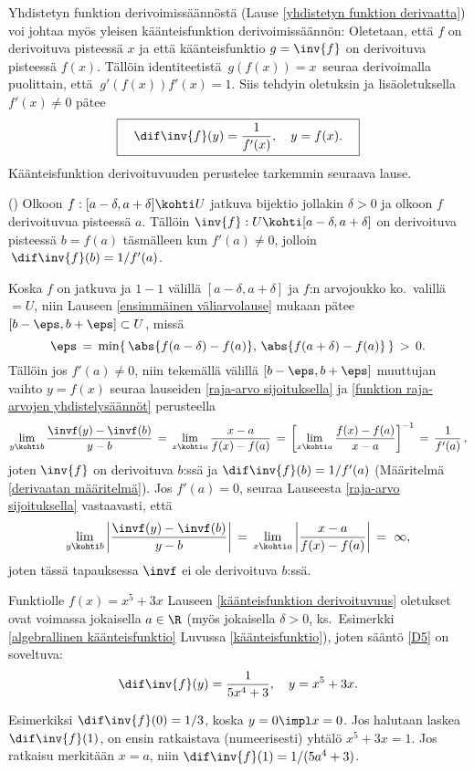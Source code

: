 Yhdistetyn funktion derivoimissäännöstä (Lause \ref{yhdistetyn funktion derivaatta}) voi
johtaa myös yleisen käänteisfunktion derivoimissäännön: Oletetaan, että $f$ on derivoituva
pisteessä $x$ ja että käänteisfunktio $g=\inv{f}$ on derivoituva pisteessä $f(x)$. Tällöin
identiteetistä $\,g(f(x))=x\,$ seuraa derivoimalla puolittain, että $\ g'(f(x))f'(x)=1$.
Siis tehdyin oletuksin ja lisäoletuksella $f'(x) \neq 0$ pätee
\begin{equation} \label{D5}
\boxed{\quad \dif\inv{f}(y)=\frac{1}{f'(x)},\quad y=f(x). \quad}
\end{equation}
Käänteisfunktion derivoituvuuden perustelee tarkemmin seuraava lause.
\begin{Lause} () \label{käänteisfunktion derivoituvuus}
%
Olkoon $f: [a-\delta,a+\delta] \kohti U$ jatkuva bijektio jollakin $\delta>0$ ja olkoon
$f$ derivoituvua pisteessä $a$. Tällöin $\inv{f}: U \kohti [a-\delta,a+\delta]$ on
derivoituva pisteessä $b=f(a)$ täsmälleen kun $f'(a) \neq 0$, jolloin 
$\,\dif \inv{f}(b)=1/f'(a)$.
\end{Lause}
\tod Koska $f$ on jatkuva ja $1-1$ välillä $[a-\delta,a+\delta]$ ja $f$:n arvojoukko
ko.\ valillä $=U$, niin Lauseen \ref{ensimmäinen väliarvolause} mukaan pätee
$[b-\eps,b+\eps] \subset U$, missä
\[
\eps \,=\, \min\{\,\abs{f(a-\delta)-f(a)},\,\abs{f(a+\delta)-f(a)}\,\} \,>\, 0.
\]
Tällöin jos $f'(a) \neq 0$, niin tekemällä välillä $[b-\eps,b+\eps]$ muuttujan
vaihto $y=f(x)$ seuraa lauseiden \ref{raja-arvo sijoituksella} ja
\ref{funktion raja-arvojen yhdistelysäännöt} perusteella
\[
\lim_{y \kohti b} \frac{\invf(y)-\invf(b)}{y-b} 
           \,=\,\lim_{x \kohti a} \frac{x-a}{f(x)-f(a)}
           \,=\,\left[\lim_{x \kohti a} \frac{f(x)-f(a)}{x-a}\right]^{-1} 
           \,=\, \frac{1}{f'(a)}\,,
\]
joten $\inv{f}$ on derivoituva $b$:ssä ja $\dif\inv{f}(b)=1/f'(a)$ (Määritelmä
\ref{derivaatan määritelmä}). Jos $f'(a)=0$, seuraa Lauseesta \ref{raja-arvo sijoituksella}
vastaavasti, että
\[
\lim_{y \kohti b} \left|\frac{\invf(y)-\invf(b)}{y-b}\right|
            \,=\, \lim_{x \kohti a} \left|\frac{x-a}{f(x)-f(a)}\right|
            \,=\ \infty,
\]
joten tässä tapauksessa $\invf$ ei ole derivoituva $b$:ssä. \loppu
\begin{Exa} \label{algebrallinen käänteisfunktio: derivaatta} Funktiolle $f(x)=x^5+3x$ 
Lauseen \ref{käänteisfunktion derivoituvuus} oletukset ovat voimassa jokaisella $a\in\R$
(myös jokaisella $\delta>0$, ks.\ Esimerkki \ref{algebrallinen käänteisfunktio} Luvussa
\ref{käänteisfunktio}), joten sääntö \eqref{D5} on soveltuva: 
\[
\dif\inv{f}(y)=\frac{1}{5x^4+3}, \quad y=x^5+3x.
\]

Esimerkiksi $\dif\inv{f}(0)=1/3$, koska $y=0 \impl x=0$. Jos halutaan laskea 
$\dif\inv{f}(1)$, on ensin ratkaistava (numeerisesti) yhtälö $x^5+3x=1$. Jos ratkaisu
merkitään $x=a$, niin $\dif\inv{f}(1)=1/(5a^4+3)$. \loppu 
\end{Exa}

